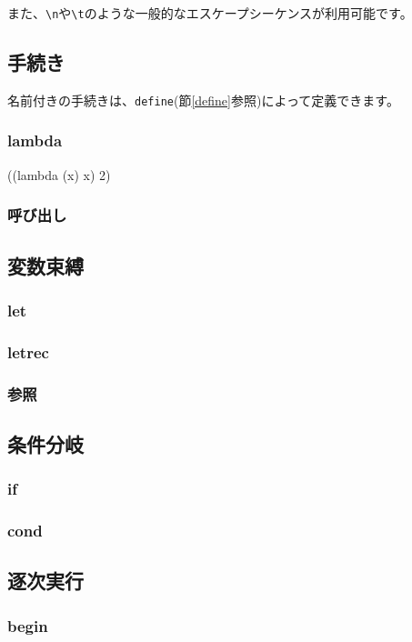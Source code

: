 \documentclass[draft]{article}
\begin{document}
また、\verb!\n!や\verb!\t!のような一般的なエスケープシーケンスが利用可能です。

\subsection{手続き}
名前付きの手続きは、\verb!define!(節\ref{define}参照)によって定義できます。

\subsubsection{lambda}


\begin{code}
((lambda (x) x) 2)
\end{code}

\subsubsection{呼び出し}

\subsection{変数束縛}
\subsubsection{let}
\subsubsection{letrec}
\subsubsection{参照}

\subsection{条件分岐}
\subsubsection{if}
\subsubsection{cond}

\subsection{逐次実行}
\subsubsection{begin}
\end{document}
